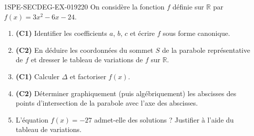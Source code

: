 \begin{exercice}{1SPE-SECDEG-EX-019}{2}{20}
On considère la fonction $f$ définie sur $\mathbb{R}$ par $f(x) = 3x^2 - 6x - 24$.

\begin{enumerate}
  \item \textbf{(C1)} Identifier les coefficients $a$, $b$, $c$ et écrire $f$ sous forme canonique.
  \item \textbf{(C2)} En déduire les coordonnées du sommet $S$ de la parabole représentative de $f$ et dresser le tableau de variations de $f$ sur $\mathbb{R}$.
  \item \textbf{(C1)} Calculer $\Delta$ et factoriser $f(x)$.
  \item \textbf{(C2)} Déterminer graphiquement (puis algébriquement) les abscisses des points d'intersection de la parabole avec l'axe des abscisses.
  \item L'équation $f(x) = -27$ admet-elle des solutions ? Justifier à l'aide du tableau de variations.
\end{enumerate}
\end{exercice}
